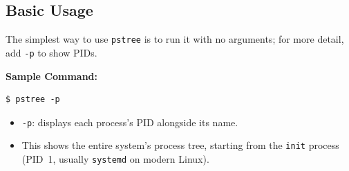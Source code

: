 \subsection{Basic Usage} %
The simplest way to use \texttt{pstree} is to run it with no arguments; for more detail, add \texttt{-p} to show PIDs. %

\textbf{Sample Command:} %
\begin{lstlisting}[language=Terminal]
$ pstree -p
\end{lstlisting} %
\begin{itemize}
    \item \texttt{-p}: displays each process's PID alongside its name. %
    \item This shows the entire system's process tree, starting from the \texttt{init} process (PID~1, usually \texttt{systemd} on modern Linux). %
\end{itemize}